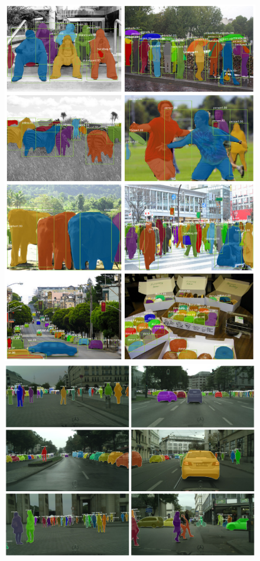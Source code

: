 \documentclass{article}
\begin{document}
\begin{figure}[htbp]
    \centering
    \begin{minipage}{0.35\textwidth}
        \centering
        \includegraphics[width=1\textwidth]{cocoexamples.PNG} %
    \end{minipage}\hfill
    \begin{minipage}{0.65\textwidth}
        \centering
        \includegraphics[width=1\textwidth]{cityscapes.PNG} %
    \end{minipage}
\end{figure}
\end{document}
